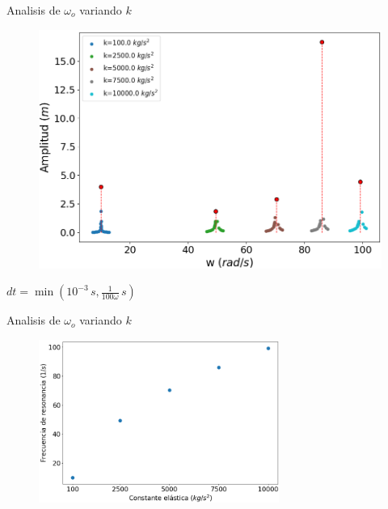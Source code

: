 \begin{frame}{Analisis de $\omega_o$ variando $k$}
    \begin{minipage}[c]{0.65\linewidth}
        \begin{figure}[H]
            \centering
            \includegraphics[width=1\textwidth]{pic/05-results/amp_w_k}
            \label{fig:amp_w_k}
        \end{figure}
    \end{minipage}
    \begin{minipage}[c]{0.34\linewidth}
        $dt = \min\left(10^{-3}\,s, \frac{1}{100 \omega}\,s\right)$
    \end{minipage}
\end{frame}

\begin{frame}{Analisis de $\omega_o$ variando $k$}
        \begin{figure}[H]
            \centering
            \includegraphics[width=0.7\textwidth]{pic/05-results/w_k}
            \label{fig:w_k}
        \end{figure}
\end{frame}

